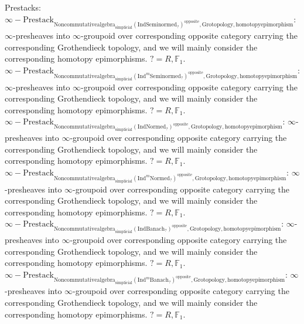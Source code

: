\documentclass[11pt]{book}
\theoremstyle{definition}
\numberwithin{equation}{section}
\begin{document}
\noindent Prestacks:\\
 
 
\noindent $\infty-\mathrm{Prestack}_{\mathrm{Noncommutativealgebra}_{\mathrm{simplicial}}(\mathrm{Ind}\mathrm{Seminormed}_?)^\mathrm{opposite},\mathrm{Grotopology,homotopyepimorphism}}$: $\infty$-presheaves into $\infty$-groupoid over corresponding opposite category carrying the corresponding Grothendieck topology, and we will mainly consider the corresponding homotopy epimorphisms. $?=R,\mathbb{F}_1$.\\
\noindent $\infty-\mathrm{Prestack}_{\mathrm{Noncommutativealgebra}_{\mathrm{simplicial}}(\mathrm{Ind}^m\mathrm{Seminormed}_?)^\mathrm{opposite},\mathrm{Grotopology,homotopyepimorphism}}$: $\infty$-presheaves into $\infty$-groupoid over corresponding opposite category carrying the corresponding Grothendieck topology, and we will mainly consider the corresponding homotopy epimorphisms. $?=R,\mathbb{F}_1$.\\
\noindent $\infty-\mathrm{Prestack}_{\mathrm{Noncommutativealgebra}_{\mathrm{simplicial}}(\mathrm{Ind}\mathrm{Normed}_?)^\mathrm{opposite},\mathrm{Grotopology,homotopyepimorphism}}$: $\infty$-presheaves into $\infty$-groupoid over corresponding opposite category carrying the corresponding Grothendieck topology, and we will mainly consider the corresponding homotopy epimorphisms. $?=R,\mathbb{F}_1$.\\
\noindent $\infty-\mathrm{Prestack}_{\mathrm{Noncommutativealgebra}_{\mathrm{simplicial}}(\mathrm{Ind}^m\mathrm{Normed}_?)^\mathrm{opposite},\mathrm{Grotopology,homotopyepimorphism}}$: $\infty$-presheaves into $\infty$-groupoid over corresponding opposite category carrying the corresponding Grothendieck topology, and we will mainly consider the corresponding homotopy epimorphisms. $?=R,\mathbb{F}_1$.\\
\noindent $\infty-\mathrm{Prestack}_{\mathrm{Noncommutativealgebra}_{\mathrm{simplicial}}(\mathrm{Ind}\mathrm{Banach}_?)^\mathrm{opposite},\mathrm{Grotopology,homotopyepimorphism}}$: $\infty$-presheaves into $\infty$-groupoid over corresponding opposite category carrying the corresponding Grothendieck topology, and we will mainly consider the corresponding homotopy epimorphisms. $?=R,\mathbb{F}_1$.\\
\noindent $\infty-\mathrm{Prestack}_{\mathrm{Noncommutativealgebra}_{\mathrm{simplicial}}(\mathrm{Ind}^m\mathrm{Banach}_?)^\mathrm{opposite},\mathrm{Grotopology,homotopyepimorphism}}$: $\infty$-presheaves into $\infty$-groupoid over corresponding opposite category carrying the corresponding Grothendieck topology, and we will mainly consider the corresponding homotopy epimorphisms. $?=R,\mathbb{F}_1$.\\
 
\end{document}
